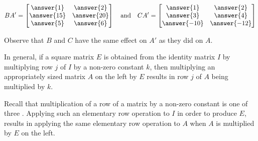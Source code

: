 \documentclass{ximera}
\begin{document}
\begin{exploration}
$$BA'=\begin{bmatrix}\answer{1}&\answer{2}\\\answer{15}&\answer{20}\\\answer{5}&\answer{6}\end{bmatrix}\quad\text{and}\quad CA'=\begin{bmatrix}\answer{1}&\answer{2}\\\answer{3}&\answer{4}\\\answer{-10}&\answer{-12}\end{bmatrix}$$

Observe that $B$ and $C$ have the same effect on $A'$ as they did on $A$.


 \end{exploration}
 
 In general, if a square matrix $E$ is obtained from the identity matrix $I$ by multiplying row $j$ of $I$ by a non-zero constant $k$, then multiplying an appropriately sized matrix $A$ on the left by $E$ results in row $j$ of $A$ being multiplied by $k$.  
 
 Recall that multiplication of a row of a matrix by a non-zero constant is one of three .  Applying such an elementary row operation to $I$ in order to produce $E$, results in applying the same elementary row operation to $A$ when $A$ is multiplied by $E$ on the left.
\end{document}
